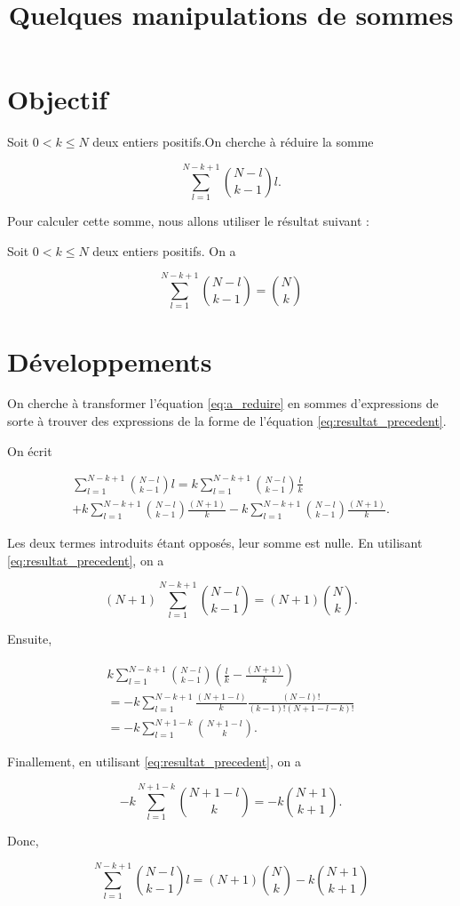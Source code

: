 \documentclass{article}
\begin{document}
\title{Quelques manipulations de sommes}

\maketitle

\section{Objectif}

Soit $0<k \leq N $ deux entiers positifs.On cherche à réduire la somme

\begin{equation}
\label{eq:a_reduire}
\sum_{l=1}^{N-k+1} {N-l \choose k-1}l.
\end{equation}

Pour calculer cette somme, nous allons utiliser le résultat suivant :

Soit $0<k \leq N $ deux entiers positifs. On a 

\begin{equation}
\label{eq:resultat_precedent}
\sum_{l=1}^{N-k+1} {N-l \choose k-1} = {N \choose k}
\end{equation}

\section{Développements}

On cherche à transformer l'équation \eqref{eq:a_reduire} en sommes d'expressions de sorte à trouver des expressions de la forme de l'équation \eqref{eq:resultat_precedent}.

On écrit

\begin{multline}
\sum_{l=1}^{N-k+1} {N-l \choose k-1}l = k\sum_{l=1}^{N-k+1} {N-l \choose k-1} \frac{l}{k} \\
+ k\sum_{l=1}^{N-k+1} {N-l \choose k-1} \frac{(N+1)}{k} - k\sum_{l=1}^{N-k+1} {N-l \choose k-1} \frac{(N+1)}{k}. 
\end{multline}

Les deux termes introduits étant opposés, leur somme est nulle. En utilisant \eqref{eq:resultat_precedent}, on a 

\begin{equation}
(N+1)\sum_{l=1}^{N-k+1} {N-l \choose k-1} = (N+1){N \choose k}.
\end{equation}

Ensuite,

\begin{multline}
k\sum_{l=1}^{N-k+1} {N-l \choose k-1}\left( \frac{l}{k}-\frac{(N+1)}{k} \right) \\
= -k\sum_{l=1}^{N-k+1} \frac{(N+1-l)}{k}\frac{(N-l)!}{(k-1)!(N+1-l-k)!}\\
= -k \sum_{l=1}^{N+1-k}{N+1-l \choose k}.
\end{multline}

Finallement, en utilisant \eqref{eq:resultat_precedent}, on a

\begin{equation}
-k \sum_{l=1}^{N+1-k}{N+1-l \choose k} = -k {N+1 \choose k+1}.
\end{equation}

Donc,

\begin{equation}
\sum_{l=1}^{N-k+1} {N-l \choose k-1}l = (N+1){N \choose k}-k {N+1 \choose k+1}
\end{equation}
\end{document}
